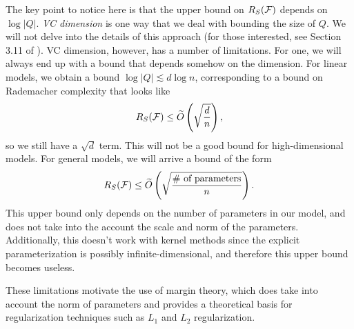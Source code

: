 The key point to notice here is that the upper bound on $R_S(\mathcal F)$ depends on $\log |Q|$. \textit{VC dimension} is one way that we deal with bounding the size of $Q$. We will not delve into the details of this approach (for those interested, see Section 3.11 of \cite{percynotes}). VC dimension, however, has a number of limitations. For one, we will always end up with a bound that depends somehow on the dimension. For linear models, we obtain a bound $\log |Q| \lesssim d \log n$, corresponding to a bound on Rademacher complexity that looks like
\begin{equation}
R_S(\mathcal F) \leq \widetilde{O} \left( \sqrt{\frac{d}{n}} \right),
\end{equation}
so we still have a $\sqrt{d}$ term. This will not be a good bound for high-dimensional models. For general models, we will arrive a bound of the form 
\begin{equation}
R_S(\mathcal F) \leq \widetilde{O} \left( \sqrt{\frac{\text{\# of parameters}}{n}} \right).
\end{equation}
This upper bound only depends on the number of parameters in our model, and does not take into the account the scale and norm of the parameters. Additionally, this doesn't work with kernel methods since the explicit parameterization is possibly infinite-dimensional, and therefore this upper bound becomes useless.


These limitations motivate the use of margin theory, which does take into account the norm of parameters and provides a theoretical basis for regularization techniques such as $L_1$ and $L_2$ regularization.
